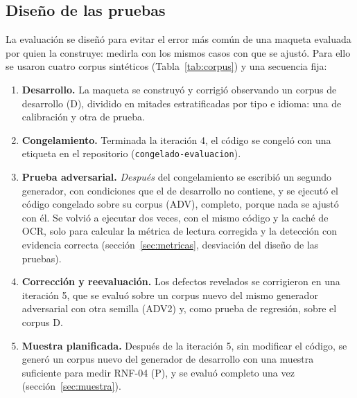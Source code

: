 \documentclass[11pt,a4paper]{article}
\begin{document}
\subsection{Diseño de las pruebas}
La evaluación se diseñó para evitar el error más común de una maqueta evaluada por quien la construye: medirla con los mismos casos con que se ajustó. Para ello se usaron cuatro corpus sintéticos (Tabla~\ref{tab:corpus}) y una secuencia fija:
\begin{enumerate}
  \item \textbf{Desarrollo.} La maqueta se construyó y corrigió observando un corpus de desarrollo (D), dividido en mitades estratificadas por tipo e idioma: una de calibración y otra de prueba.
  \item \textbf{Congelamiento.} Terminada la iteración 4, el código se congeló con una etiqueta en el repositorio (\texttt{congelado-evaluacion}).
  \item \textbf{Prueba adversarial.} \emph{Después} del congelamiento se escribió un segundo generador, con condiciones que el de desarrollo no contiene, y se ejecutó el código congelado sobre su corpus (ADV), completo, porque nada se ajustó con él. Se volvió a ejecutar dos veces, con el mismo código y la caché de OCR, solo para calcular la métrica de lectura corregida y la detección con evidencia correcta (sección~\ref{sec:metricas}, desviación del diseño de las pruebas).
  \item \textbf{Corrección y reevaluación.} Los defectos revelados se corrigieron en una iteración 5, que se evaluó sobre un corpus nuevo del mismo generador adversarial con otra semilla (ADV2) y, como prueba de regresión, sobre el corpus D.
  \item \textbf{Muestra planificada.} Después de la iteración 5, sin modificar el código, se generó un corpus nuevo del generador de desarrollo con una muestra suficiente para medir RNF-04 (P), y se evaluó completo una vez (sección~\ref{sec:muestra}).
\end{enumerate}
\end{document}
